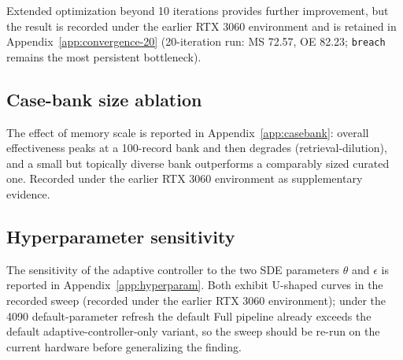 Extended optimization beyond 10 iterations provides further improvement, but the result is recorded under the earlier RTX 3060 environment and is retained in Appendix~\ref{app:convergence-20} (20-iteration run: MS 72.57, OE 82.23; \texttt{breach} remains the most persistent bottleneck).

\subsection{Case-bank size ablation}

The effect of memory scale is reported in Appendix~\ref{app:casebank}: overall effectiveness peaks at a 100-record bank and then degrades (retrieval-dilution), and a small but topically diverse bank outperforms a comparably sized curated one. Recorded under the earlier RTX 3060 environment as supplementary evidence.

\subsection{Hyperparameter sensitivity}

The sensitivity of the adaptive controller to the two SDE parameters $\theta$ and $\epsilon$ is reported in Appendix~\ref{app:hyperparam}. Both exhibit U-shaped curves in the recorded sweep (recorded under the earlier RTX 3060 environment); under the 4090 default-parameter refresh the default Full pipeline already exceeds the default adaptive-controller-only variant, so the sweep should be re-run on the current hardware before generalizing the finding.
